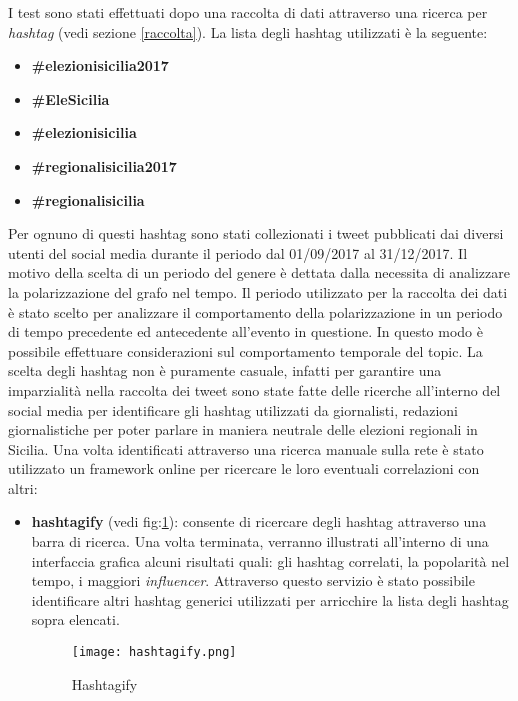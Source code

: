 I test sono stati effettuati dopo una raccolta di dati attraverso una ricerca per \textit{hashtag} (vedi sezione \ref{raccolta}). La lista degli hashtag utilizzati è la seguente:
\begin{itemize}
\item \textbf{\#elezionisicilia2017}
\item \textbf{\#EleSicilia}
\item \textbf{\#elezionisicilia}
\item \textbf{\#regionalisicilia2017}
\item \textbf{\#regionalisicilia}
\end{itemize}
Per ognuno di questi hashtag sono stati collezionati i tweet pubblicati dai diversi utenti del social media durante il periodo dal 01/09/2017 al 31/12/2017.
Il motivo della scelta di un periodo del genere è dettata dalla necessita di analizzare la polarizzazione del grafo nel tempo. Il periodo utilizzato per la raccolta dei dati è stato scelto per analizzare il comportamento della polarizzazione in un periodo di tempo precedente ed antecedente all'evento in questione. In questo modo è possibile effettuare considerazioni sul comportamento temporale del topic.
La scelta degli hashtag non è puramente casuale, infatti per garantire una imparzialità nella raccolta dei tweet sono state fatte delle ricerche all'interno del social media per identificare gli hashtag utilizzati da giornalisti, redazioni giornalistiche per poter parlare in maniera neutrale delle elezioni regionali in Sicilia.
Una volta identificati attraverso una ricerca manuale sulla rete è stato utilizzato un framework online per ricercare le loro eventuali correlazioni con altri:
\begin{itemize}
\item \textbf{hashtagify} (vedi fig:\ref{Hashtagify}): consente di ricercare degli hashtag attraverso una barra di ricerca. Una volta terminata, verranno illustrati all'interno di una interfaccia grafica alcuni risultati quali: gli hashtag correlati, la popolarità nel tempo, i maggiori \textit{influencer}.
Attraverso questo servizio è stato possibile identificare altri hashtag generici utilizzati per arricchire la lista degli hashtag sopra elencati.
\begin{figure}[!htb]
    \begin{center}
      \texttt{[image: hashtagify.png]}
	\caption{Hashtagify}
	\label{Hashtagify}
    \end{center}
  \end{figure}
  
\end{itemize}

